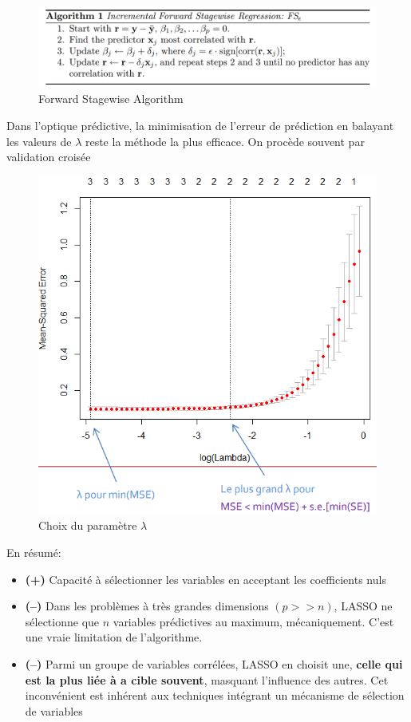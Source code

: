 \documentclass[a4paper]{article}
\begin{document}
\begin{figure}[H]
    \centering
    \includegraphics[scale=0.4]{figures/algo.png}
    \caption{Forward Stagewise Algorithm}
    \label{fig:enter-label}
\end{figure}

Dans l’optique prédictive, la minimisation de l’erreur de prédiction en balayant les valeurs de $\lambda$
reste la méthode la plus efficace. On procède souvent par validation croisée

\begin{figure}[H]
    \centering
    \includegraphics[scale=0.7]{figures/lasso.png}
    \caption{Choix du paramètre $\lambda$}
    \label{fig:enter-label}
\end{figure}

En résumé:
\begin{itemize}
    \item \textbf{(+)} Capacité à sélectionner les variables en acceptant les coefficients nuls
    \item \textbf{(--)} Dans les problèmes à très grandes dimensions $(p >> n)$, LASSO ne sélectionne que $n$ variables prédictives au maximum, mécaniquement. C’est une vraie limitation de l’algorithme.
    \item \textbf{(--)} Parmi un groupe de variables corrélées, LASSO en choisit une, \textbf{celle qui est la plus liée à a cible souvent}, masquant l’influence des autres. Cet inconvénient est inhérent aux techniques intégrant un mécanisme de sélection de variables
\end{itemize}
\end{document}

